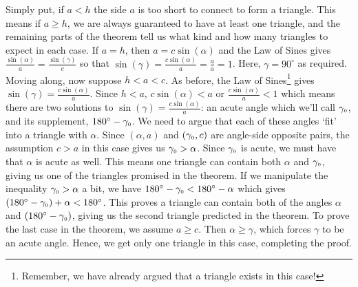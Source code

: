 Simply put, if $a < h$ the side $a$ is too short to connect to form a triangle. This means if $a \geq h$, we are always guaranteed to have at least one triangle, and the remaining parts of the theorem tell us what kind and how many triangles to expect in each case. If $a = h$, then $a = c\sin(\alpha)$ and the Law of Sines gives $\frac{\sin(\alpha)}{a} = \frac{\sin(\gamma)}{c}$ so that $\sin(\gamma) = \frac{c \sin(\alpha)}{a} = \frac{a}{a} = 1$.  Here,  $\gamma = 90^{\circ}$ as required. Moving along, now suppose $h < a < c$. As before, the Law of Sines\footnote{Remember, we have already argued that a triangle exists in this case!} gives $\sin(\gamma) = \frac{c \sin(\alpha)}{a}$.  Since $h < a$, $c \sin(\alpha) < a$ or $\frac{c\sin(\alpha)}{a} < 1$  which means there are two solutions to $\sin(\gamma) = \frac{c \sin(\alpha)}{a}$:  an acute angle which we'll call $\gamma_{\mbox{\tiny $0$}}$, and its supplement, $180^{\circ} - \gamma_{\mbox{\tiny $0$}}$.   We need to argue that each of these angles `fit' into a  triangle with $\alpha$.  Since $(\alpha, a)$ and $(\gamma_{\mbox{\tiny $0$}},c)$ are angle-side opposite pairs,  the assumption $c > a$ in this case gives us $\gamma_{\mbox{\tiny $0$}} > \alpha$. Since $\gamma_{\mbox{\tiny $0$}}$ is acute, we must have that $\alpha$ is acute as well.  This means one triangle  can contain both $\alpha$ and $\gamma_{\mbox{\tiny $0$}}$, giving us one of the triangles promised in the theorem.  If we manipulate the inequality $\gamma_{\mbox{\tiny $0$}} > \alpha$ a bit, we have  $180^{\circ} - \gamma_{\mbox{\tiny $0$}} < 180^{\circ} - \alpha$ which gives $\left(180^{\circ} - \gamma_{\mbox{\tiny $0$}}\right) + \alpha < 180^{\circ}$. This proves a triangle can contain both of the angles $\alpha$ and $\left(180^{\circ} - \gamma_{\mbox{\tiny $0$}}\right)$, giving us the second triangle predicted in the theorem. To prove the last case in the theorem, we assume $a \geq c$.  Then $\alpha \geq \gamma$, which forces $\gamma$ to be an acute angle. Hence, we get only one triangle in this case, completing the proof.
 
